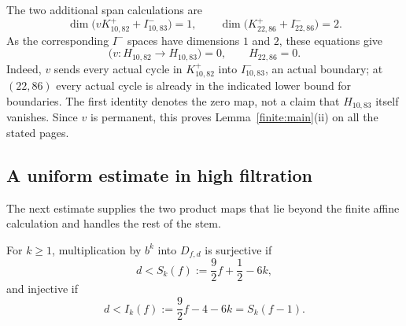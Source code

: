 The two additional span calculations are
\begin{equation}\label{finite:span-dimensions}
 \dim\bigl(vK^+_{10,82}+I^-_{10,83}\bigr)=1,
 \qquad
 \dim\bigl(K^+_{22,86}+I^-_{22,86}\bigr)=2.
\end{equation}
As the corresponding $I^-$ spaces have dimensions $1$ and $2$,
these equations give
\begin{equation}\label{finite:first-consequences}
 \bigl(v\colon H_{10,82}\longrightarrow H_{10,83}\bigr)=0,
 \qquad H_{22,86}=0.
\end{equation}
Indeed, $v$ sends every actual cycle in $K^+_{10,82}$ into
$I^-_{10,83}$, an actual boundary; at $(22,86)$ every actual cycle
is already in the indicated lower bound for boundaries.  The first
identity denotes the zero map, not a claim that $H_{10,83}$ itself
vanishes.  Since $v$ is permanent, this proves
Lemma~\ref{finite:main}\textup{(ii)} on all the stated pages.

\subsection{A uniform estimate in high filtration}

The next estimate supplies the two product maps that lie beyond
the finite affine calculation and handles the rest of the stem.

\begin{samepage}
\begin{lemma}\label{finite:highweight}
For $k\geq1$, multiplication by $b^k$ into $D_{f,d}$ is surjective if
\begin{equation}\label{finite:surjective-bound}
 d<S_k(f):=\frac92f+\frac12-6k,
\end{equation}
and injective if
\begin{equation}\label{finite:injective-bound}
 d<I_k(f):=\frac92f-4-6k=S_k(f-1).
\end{equation}
\end{lemma}
\end{samepage}

